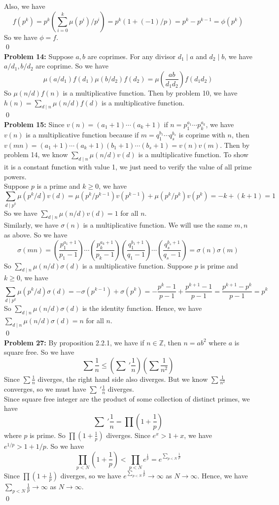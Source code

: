 \documentclass[12pt]{amsart}
\newcommand{\Z}{\mathbb{Z}}
\begin{document}
Also, we have 
\[f(p^k)=p^k(\sum_{i=0}^k\mu(p^i)/p^i)=p^k(1+(-1)/p)=p^k-p^{k-1}=\phi(p^k)\]
So we have $\phi=f$.
\\\qed\\
\textbf{Problem 14:} Suppose $a,b$ are coprimes. For any divisor $d_1\mid a$ and $d_2\mid b$, we have $a/d_1,b/d_2$ are coprime. So we have
\[\mu(a/d_1)f(d_1)\mu(b/d_2)f(d_2)=\mu(\frac{ab}{d_1d_2})f(d_1d_2)\]
So $\mu(n/d) f(n)$ is a multiplicative function. Then by problem 10, we have $h(n)=\sum_{d\mid n}\mu(n/d)f(d)$ is a multiplicative function.
\\\qed\\
\textbf{Problem 15:}
Since $v(n)=(a_1+1)\cdots (a_k+1)$ if $n=p_1^{a_1}\cdots p_k^{a_k}$, we have $v(n)$ is a multiplicative function because if $m=q_1^{b_1}\cdots q_s^{b_s}$ is coprime with $n$, then $v(mn)=(a_1+1)\cdots (a_k+1)(b_1+1)\cdots(b_s+1)=v(n)v(m).$ Then by problem 14, we know $\sum_{d\mid n}\mu(n/d)v(d)$ is a multiplicative function. To show it is a constant function with value 1, we just need to verify the value of all prime powers. \\
Suppose $p$ is a prime and $k\geq 0$, we have 
\[\sum_{d\mid p^k}\mu(p^k/d)v(d)=\mu(p^k/p^{k-1})v(p^{k-1})+\mu(p^k/p^k)v(p^k)=-k+(k+1)=1\]
So we have $\sum_{d\mid n}\mu(n/d)v(d)=1$ for all $n$. \\
Similarly, we have $\sigma(n)$ is a multiplicative function. We will use the same $m,n$ as above. So we have 
\[\sigma(mn)=(\frac{p_1^{a_1+1}}{p_1-1})\cdots (\frac{p_k^{a_k+1}}{p_k-1})(\frac{q_1^{b_1+1}}{q_1-1})\cdots (\frac{q_s^{b_s+1}}{q_s-1})=\sigma(n)\sigma(m)\]
So $\sum_{d\mid n}\mu(n/d )\sigma(d)$ is a multiplicative function. Suppose $p$ is prime and $k\geq 0$, we have 
\[\sum_{d\mid p^k}\mu(p^k/d)\sigma(d)=-\sigma(p^{k-1})+\sigma(p^k)=-\frac{p^k-1}{p-1}+\frac{p^{k+1}-1}{p-1}=\frac{p^{k+1}-p^k}{p-1}=p^k\]
So $\sum_{d\mid n}\mu(n/d)\sigma(d)$ is the identity function. Hence, we have $\sum_{d\mid n}\mu(n/d)\sigma(d)=n$ for all $n$.
\\\qed\\
\textbf{Problem 27:} By proposition 2.2.1, we have if $n\in \Z$, then $n=ab^2$ where $a$ is square free. So we have 
\[\sum\frac{1}{n}\leq (\sum\ '\frac{1}{n})(\sum\frac{1}{n^2})\]
Since $\sum\frac{1}{n}$ diverges, the right hand side also diverges. But we know $\sum\frac{1}{n^2}$ converges, so we must have $\sum\ '\frac{1}{n}$ diverges.\\
Since square free integer are the product of some collection of distinct primes, we have 
\[\sum\ '\frac{1}{n}=\prod(1+\frac{1}{p})\]
where $p$ is prime.
So $\prod(1+\frac{1}{p})$ diverges. Since $e^x>1+x$, we have $e^{1/p}>1+1/p$. So we have 
\[\prod_{p<N}(1+\frac{1}{p})<\prod_{p<N} e^{\frac{1}{p}}=e^{\sum_{p<N}\frac{1}{p}}\]
Since $\prod(1+\frac{1}{p})$ diverges, so we have $e^{\sum_{p<N}\frac{1}{p}}\rightarrow \infty$ as $N\rightarrow \infty$. Hence, we have $\sum_{p<N}\frac{1}{p}\rightarrow \infty$ as $N\rightarrow\infty$.
\\\qed\\
\end{document}
